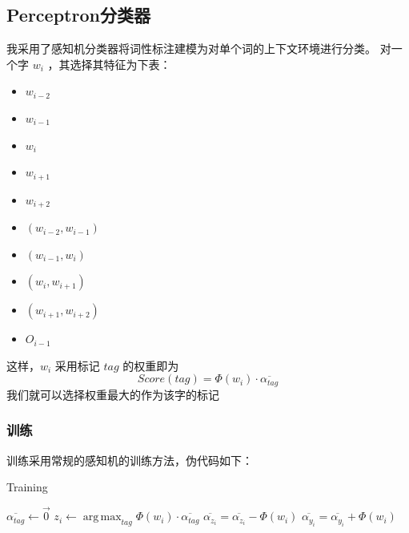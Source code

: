 \documentclass[11pt, a4paper]{article}
\DeclareMathOperator*{\argmax}{arg\,max}
\begin{document}
\begin{CJK*}{UTF8}{gbsn}
			\subsection{Perceptron分类器}
				我采用了感知机分类器将词性标注建模为对单个词的上下文环境进行分类。
				对一个字 $w_i$ ，其选择其特征为下表：
				\begin{multicols}{3}
						\begin{itemize}
							\item $w_{i - 2}$
							\item $w_{i - 1}$
							\item $w_i$
							\item $w_{i + 1}$
							\item $w_{i + 2}$
							\item $(w_{i - 2},w_{i - 1})$
							\item $(w_{i - 1},w_i)$
							\item $(w_{i},w_{i + 1})$
							\item $(w_{i + 1},w_{i + 2})$
							\item $O_{i - 1}$
						\end{itemize}
				\end{multicols}
				这样，$w_i$ 采用标记 $tag$ 的权重即为
				\begin{equation*}
					Score(tag) = \Phi(w_i) \cdot \overline{\alpha_{tag}}
				\end{equation*}
				我们就可以选择权重最大的作为该字的标记
				\subsubsection{训练}
					训练采用常规的感知机的训练方法，伪代码如下：
					\begin{algorithm}
						\caption{Training}               %
						\label{alg1}                         %
						\begin{algorithmic}
								\STATE $\overline{\alpha_{tag}}\leftarrow \vec{0}$
							\ENDFOR
									\STATE $z_i \leftarrow \argmax_{tag}{\Phi(w_i)\cdot\overline{\alpha_{tag}}}$
										\STATE $\overline{\alpha_{z_i}} = \overline{\alpha_{z_i}} - \Phi(w_i)$
										\STATE $\overline{\alpha_{y_i}} = \overline{\alpha_{y_i}} + \Phi(w_i)$
									\ENDIF
								\ENDFOR
							\ENDFOR
						\end{algorithmic}
					\end{algorithm}	

\end{CJK*}
\end{document}
